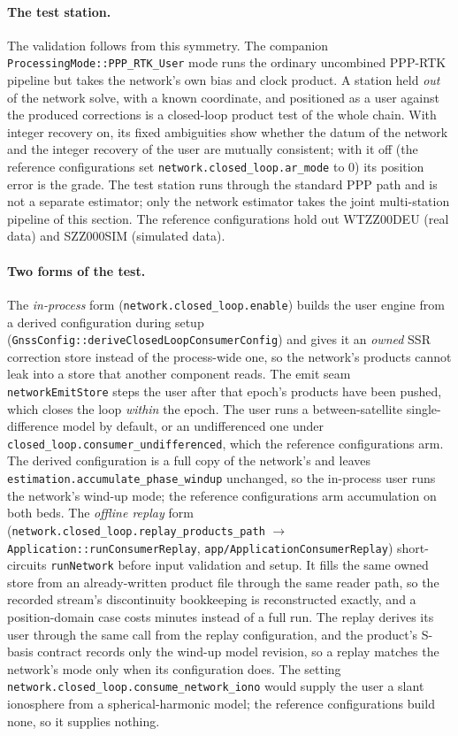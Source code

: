 \documentclass[main.tex]{subfiles}
\begin{document}
\paragraph{The test station.}
The validation follows from this symmetry. The companion
\texttt{ProcessingMode::PPP\_RTK\_User} mode runs the ordinary uncombined
PPP-RTK pipeline but takes the network's own bias and clock product. A
station held \emph{out} of the network solve, with a known coordinate,
and positioned as a user against the produced corrections is a
closed-loop product test of the whole chain. With integer recovery on,
its fixed ambiguities show whether the datum of the network and the
integer recovery of the user are mutually consistent; with it off (the
reference configurations set \texttt{network.closed\_loop.ar\_mode} to
$0$) its position error is the grade. The test station runs through the
standard PPP path and is not a separate estimator; only the network
estimator takes the joint multi-station pipeline of this section. The
reference configurations hold out WTZZ00DEU (real data) and SZZ000SIM
(simulated data).

\paragraph{Two forms of the test.}
The \emph{in-process} form (\texttt{network.closed\_loop.enable}) builds
the user engine from a derived configuration during setup
(\texttt{GnssConfig::deriveClosedLoopConsumerConfig}) and gives it an
\emph{owned} SSR correction store instead of the process-wide one, so the
network's products cannot leak into a store that another component reads.
The emit seam \texttt{networkEmitStore} steps the user after that
epoch's products have been pushed, which closes the loop \emph{within}
the epoch. The user runs a between-satellite single-difference model by
default, or an undifferenced one under
\texttt{closed\_loop.consumer\_undifferenced}, which the reference
configurations arm. The derived configuration is a full copy of the
network's and leaves \texttt{estimation.accumulate\_phase\_windup}
unchanged, so the in-process user runs the network's wind-up mode; the
reference configurations arm accumulation on both beds. The
\emph{offline replay} form
(\texttt{network.closed\_loop.replay\_products\_path} $\to$
\texttt{Application::runConsumerReplay},
\texttt{app/ApplicationConsumerReplay}) short-circuits
\texttt{runNetwork} before input validation and setup. It fills the same
owned store from an already-written product file through the same reader
path, so the recorded stream's discontinuity bookkeeping is reconstructed
exactly, and a position-domain case costs minutes instead of a full run.
The replay derives its user through the same call from the replay
configuration, and the product's S-basis contract records only the
wind-up model revision, so a replay matches the network's mode only when
its configuration does. The setting
\texttt{network.closed\_loop.consume\_network\_iono} would supply the
user a slant ionosphere from a spherical-harmonic model; the reference
configurations build none, so it supplies nothing.
\end{document}
